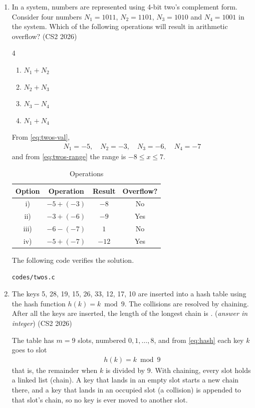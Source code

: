 \begin{enumerate}[label=\thesubsection.\arabic*, ref=\thesubsection.\theenumi]
\item In a system, numbers are represented using 4-bit two's complement
form. Consider four numbers $N_1 = 1011$, $N_2 = 1101$, $N_3 = 1010$ and
$N_4 = 1001$ in the system. Which of the following operations will result
in arithmetic overflow?
\hfill (CS2 2026)
\begin{multicols}{4}
\begin{enumerate}[label=\roman*)]
  \item $N_1 + N_2$
  \item $N_2 + N_3$
  \item $N_3 - N_4$
  \item $N_1 + N_4$
\end{enumerate}
\end{multicols}
\solution From \eqref{eq:twos-val},
\begin{align}
N_1 = -5, \quad N_2 = -3, \quad N_3 = -6, \quad N_4 = -7
\end{align}
and from \eqref{eq:twos-range} the range is $-8 \le x \le 7$.
\begin{table}[H]
\centering
\begin{tabular}{|c|c|c|c|}
\hline
\textbf{Option} & \textbf{Operation} & \textbf{Result} & \textbf{Overflow?} \\
\hline
i) & $-5 + (-3)$ & $-8$ & No \\
ii) & $-3 + (-6)$ & $-9$ & Yes \\
iii) & $-6 - (-7)$ & $1$ & No \\
iv) & $-5 + (-7)$ & $-12$ & Yes \\
\hline
\end{tabular}
\caption{Operations}
\end{table}

The following code verifies the solution.
\begin{lstlisting}
codes/twos.c
\end{lstlisting}

\item The keys 5, 28, 19, 15, 26, 33, 12, 17, 10 are inserted into a hash
table using the hash function $h(k) = k \bmod 9$. The collisions are
resolved by chaining. After all the keys are inserted, the length of the
longest chain is \underline{\hspace{1.5cm}}. (\textit{answer in integer})
\hfill (CS2 2026)

\solution The table has $m = 9$ slots, numbered $0, 1, \dots, 8$, and from
\eqref{eq:hash} each key $k$ goes to slot
\begin{align}
h(k) = k \bmod 9
\label{eq:q30-hash}
\end{align}
that is, the remainder when $k$ is divided by $9$. With chaining, every slot
holds a linked list (chain). A key that lands in an empty slot starts a new
chain there, and a key that lands in an occupied slot (a collision) is
appended to that slot's chain, so no key is ever moved to another slot.


\end{enumerate}
